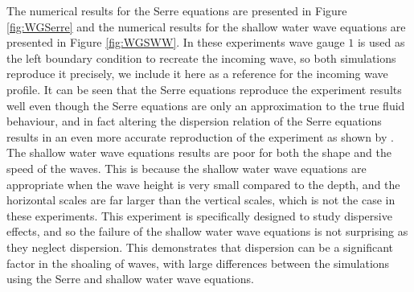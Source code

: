 \documentclass[a4paper,fleqn]{article} %
\begin{document}
The numerical results for the Serre equations are presented in Figure \ref{fig:WGSerre} and the numerical results for the shallow water wave equations are presented in Figure \ref{fig:WGSWW}. In these experiments wave gauge $1$ is used as the left boundary condition to recreate the incoming wave, so both simulations reproduce it precisely, we include it here as a reference for the incoming wave profile. It can be seen that the Serre equations reproduce the experiment results well even though the Serre equations are only an approximation to the true fluid behaviour, and in fact altering the dispersion relation of the Serre equations results in an even more accurate reproduction of the experiment as shown by \cite{Lannes-2013}. The shallow water wave equations results are poor for both the shape and the speed of the waves. This is because the shallow water wave equations are appropriate when the wave height is very small compared to the depth, and the horizontal scales are far larger than the vertical scales, which is not the case in these experiments. This experiment is specifically designed to study dispersive effects, and so the failure of the shallow water wave equations is not surprising as they neglect  dispersion. This demonstrates that dispersion can be a significant factor in the shoaling of waves, with large differences between the simulations using the Serre and shallow water wave equations.
\end{document}
